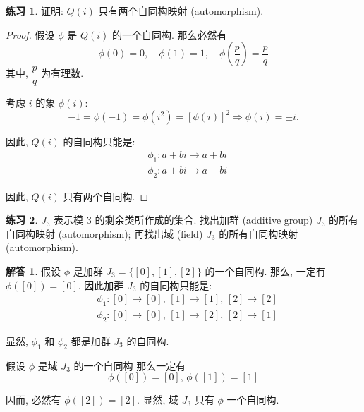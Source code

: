 \documentclass[utf8]{ctexbook}
\theoremstyle{definition}
\newtheorem{exercise}{练习}[section]
\newtheorem*{soln}{解答}
\begin{document}
\begin{exercise}
证明: $Q(i)$ 只有两个自同构映射 (automorphism).
\end{exercise}

\begin{proof}
假设 $\phi$ 是 $Q(i)$ 的一个自同构. 那么必然有
\begin{equation}
\phi(0) = 0, \quad \phi(1) = 1, \quad \phi(\frac{p}{q}) = \frac{p}{q}
\end{equation}
其中, $\dfrac{p}{q}$ 为有理数.

考虑 $i$ 的象 $\phi(i)$:
\begin{equation}
-1 = \phi(-1) = \phi(i^2) = [\phi(i)]^2 \Longrightarrow \phi(i) = \pm i .
\end{equation}

因此, $Q(i)$ 的自同构只能是:
\begin{align*}
& \phi_1 : a + bi \longrightarrow a + bi \\
& \phi_2 : a + bi \longrightarrow a - bi
\end{align*}

因此, $Q(i)$ 只有两个自同构.

\end{proof}


\begin{exercise}
$J_3$ 表示模 $3$ 的剩余类所作成的集合. 找出加群 (additive group) $J_3$ 的所有自同构映射 (automorphism); 再找出域 (field) $J_3$ 的所有自同构映射 (automorphism).
\end{exercise}

\begin{soln}
假设 $\phi$ 是加群 $J_3 = \{[0], [1], [2] \}$ 的一个自同构. 那么, 一定有 $\phi([0]) = [0]$. 因此加群 $J_3$ 的自同构只能是:
\begin{align*}
& \phi_1 : [0] \rightarrow [0], \, [1] \rightarrow [1], \, [2] \rightarrow [2] \\
& \phi_2 : [0] \rightarrow [0], \, [1] \rightarrow [2], \, [2] \rightarrow [1]
\end{align*}

显然, $\phi_1$ 和 $\phi_2 $ 都是加群 $J_3$ 的自同构.

假设 $\phi$ 是域 $J_3$ 的一个自同构 那么一定有
\begin{equation}
\phi([0]) = [0] ,\, \phi([1]) = [1] 
\end{equation}

因而, 必然有 $\phi([2]) = [2]$. 显然, 域 $J_3$ 只有 $\phi$ 一个自同构.


\end{soln}
\end{document}
